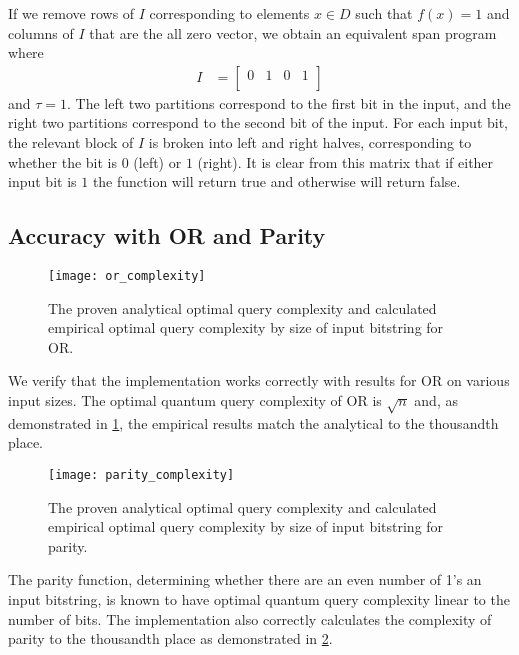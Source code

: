 If we remove rows of $I$ corresponding to elements 
$ x \in D$ such that $f(x) = 1$
and columns of $I$ that are the 
all zero vector, we obtain an equivalent span program where
\begin{align}
I &= \left[\begin{array}{cccc}
   0 & 1 & 0 & 1 \\
\end{array} \right] \nonumber
\end{align}
and $\tau = 1$.
The left two partitions
correspond to the first bit in the
input, and the right two partitions correspond 
to the second bit of the input. For each
input bit, the relevant block of $I$ 
is broken into left and right halves, corresponding
to whether the bit is $0$ (left) or $1$ (right). 
It is clear from this matrix that if either input bit is
$1$ the function will return true and otherwise
will return false.

\subsection{Accuracy with OR and Parity}

\begin{figure}[H]
\centering
\texttt{[image: or\_complexity]}
\caption{The proven analytical optimal query complexity
and calculated empirical optimal query complexity by 
size of input bitstring for OR.}
\label{fig:or_complexity}
\end{figure}

We verify that the implementation works correctly
with results for OR on various input sizes.
The optimal quantum query complexity of OR
is $\sqrt{n}$ and, as demonstrated in
\cref{fig:or_complexity}, the empirical results match the analytical
to the thousandth place.

\begin{figure}[H]
\centering
\texttt{[image: parity\_complexity]}
\caption{The proven analytical optimal query complexity
and calculated empirical optimal query complexity by 
size of input bitstring for parity.}
\label{fig:parity_complexity}
\end{figure}

The parity function, determining whether
there are an even number of 1's an input
bitstring, is known to have optimal
quantum query complexity linear to the number of bits.
The implementation also correctly
calculates the complexity of parity to the thousandth
place as demonstrated in \cref{fig:parity_complexity}.

